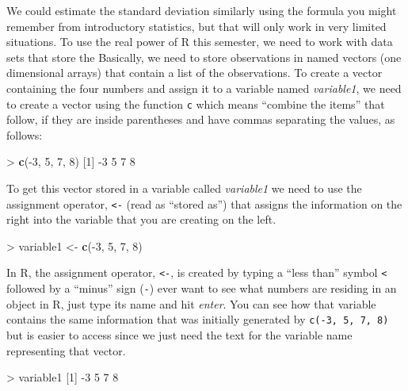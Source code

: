 \documentclass[]{book}
\newenvironment{Shaded}{\begin{snugshade}}{\end{snugshade}}
\newcommand{\KeywordTok}[1]{\textcolor[rgb]{0.13,0.29,0.53}{\textbf{{#1}}}}
\newcommand{\DecValTok}[1]{\textcolor[rgb]{0.00,0.00,0.81}{{#1}}}
\newcommand{\StringTok}[1]{\textcolor[rgb]{0.31,0.60,0.02}{{#1}}}
\newcommand{\NormalTok}[1]{{#1}}
\begin{document}
We could estimate the standard deviation similarly using the formula you
might remember from introductory statistics, but that will only work in
very limited situations. To use the real power of R this semester, we
need to work with data sets that store the Basically, we need to store
observations in named vectors (one dimensional arrays) that contain a
list of the observations. To create a vector containing the four numbers
and assign it to a variable named \emph{variable1}, we need to create a
vector using the function \texttt{c} which means ``combine the items''
that follow, if they are inside parentheses and have commas separating
the values, as follows:

\begin{Shaded}
\begin{Highlighting}[]
\NormalTok{>}\StringTok{ }\KeywordTok{c}\NormalTok{(-}\DecValTok{3}\NormalTok{, }\DecValTok{5}\NormalTok{, }\DecValTok{7}\NormalTok{, }\DecValTok{8}\NormalTok{)}
\NormalTok{[}\DecValTok{1}\NormalTok{] -}\DecValTok{3} \DecValTok{5} \DecValTok{7} \DecValTok{8}
\end{Highlighting}
\end{Shaded}

To get this vector stored in a variable called \emph{variable1} we need
to use the assignment operator, \texttt{\textless{}-} (read as ``stored
as'') that assigns the information on the right into the variable that
you are creating on the left.

\begin{Shaded}
\begin{Highlighting}[]
\NormalTok{>}\StringTok{ }\NormalTok{variable1 <-}\StringTok{ }\KeywordTok{c}\NormalTok{(-}\DecValTok{3}\NormalTok{, }\DecValTok{5}\NormalTok{, }\DecValTok{7}\NormalTok{, }\DecValTok{8}\NormalTok{)}
\end{Highlighting}
\end{Shaded}

In R, the assignment operator, \texttt{\textless{}-}, is created by
typing a ``less than'' symbol \texttt{\textless{}} followed by a
``minus'' sign (\texttt{-}) ever want to see what numbers are residing
in an object in R, just type its name and hit \emph{enter}. You can see
how that variable contains the same information that was initially
generated by \texttt{c(-3,\ 5,\ 7,\ 8)} but is easier to access since we
just need the text for the variable name representing that vector.

\begin{Shaded}
\begin{Highlighting}[]
\NormalTok{>}\StringTok{ }\NormalTok{variable1}
\NormalTok{[}\DecValTok{1}\NormalTok{] -}\DecValTok{3} \DecValTok{5} \DecValTok{7} \DecValTok{8}
\end{Highlighting}
\end{Shaded}
\end{document}
